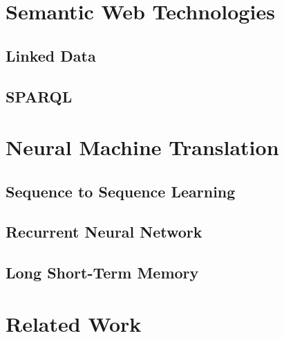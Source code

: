 \section{Semantic Web Technologies}
\subsection{Linked Data}
\subsection{SPARQL}

\section{Neural Machine Translation}
\subsection{Sequence to Sequence Learning}
\subsection{Recurrent Neural Network}
\subsection{Long Short-Term Memory}

\section{Related Work}